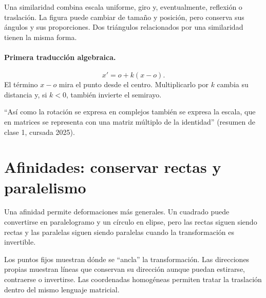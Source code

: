 Una similaridad combina escala uniforme, giro y, eventualmente, reflexión o traslación. La
figura puede cambiar de tamaño y posición, pero conserva sus ángulos y sus proporciones. Dos
triángulos relacionados por una similaridad tienen la misma forma.

\paragraph{Primera traducción algebraica.}
\[
  x'=o+k(x-o).
\]
El término \(x-o\) mira el punto desde el centro. Multiplicarlo por \(k\) cambia su distancia
y, si \(k<0\), también invierte el semirayo.

\begin{idea}
``Así como la rotación se expresa en complejos también se expresa la escala, que en
matrices se representa con una matriz múltiplo de la identidad'' (resumen de clase 1, cursada 2025).
\end{idea}

\section{Afinidades: conservar rectas y paralelismo}\label{sec:afinidades-primera}

{\small\vspace{1mm}\par}


Una afinidad permite deformaciones más generales. Un cuadrado puede convertirse en
paralelogramo y un círculo en elipse, pero las rectas siguen siendo rectas y las paralelas
siguen siendo paralelas cuando la transformación es invertible.

\begin{center}
\end{center}

Los puntos fijos muestran dónde se ``ancla'' la transformación. Las direcciones propias
muestran líneas que conservan su dirección aunque puedan estirarse, contraerse o invertirse.
Las coordenadas homogéneas permiten tratar la traslación dentro del mismo lenguaje matricial.

